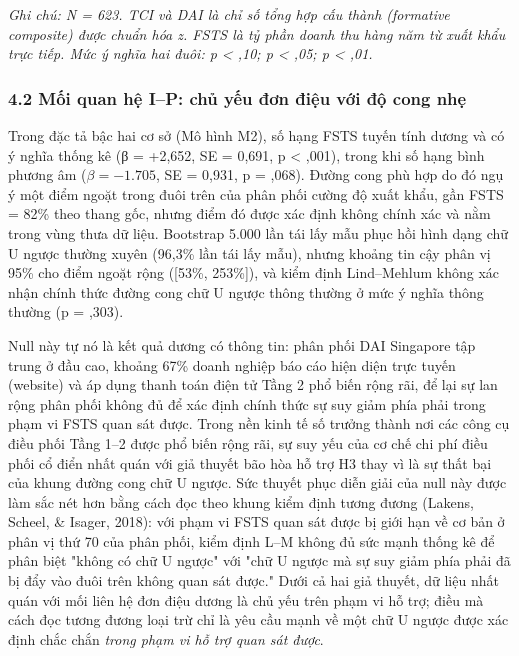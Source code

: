 \documentclass[12pt,a4paper]{article}
\begin{document}
\emph{Ghi chú: N = 623. TCI và DAI là chỉ số tổng hợp cấu thành
(formative composite) được chuẩn hóa z. FSTS là tỷ phần doanh thu hàng
năm từ xuất khẩu trực tiếp. Mức ý nghĩa hai đuôi: p \textless{} ,10; p
\textless{} ,05; p \textless{} ,01.}

\hypertarget{42-mux1ed1i-quan-hux1ec7-ip-chux1ee7-yux1ebfu-ux111ux1a1n-ux111iux1ec7u-vux1edbi-ux111ux1ed9-cong-nhux1eb9}{%
\subsubsection{4.2 Mối quan hệ I--P: chủ yếu đơn điệu với độ cong
nhẹ}\label{42-mux1ed1i-quan-hux1ec7-ip-chux1ee7-yux1ebfu-ux111ux1a1n-ux111iux1ec7u-vux1edbi-ux111ux1ed9-cong-nhux1eb9}}

Trong đặc tả bậc hai cơ sở (Mô hình M2), số hạng FSTS tuyến tính dương
và có ý nghĩa thống kê (β = +2,652, SE = 0,691, p \textless{} ,001),
trong khi số hạng bình phương âm (\(\beta = −1.705\), SE = 0,931, p =
,068). Đường cong phù hợp do đó ngụ ý một điểm ngoặt trong đuôi trên của
phân phối cường độ xuất khẩu, gần FSTS = 82\% theo thang gốc, nhưng điểm
đó được xác định không chính xác và nằm trong vùng thưa dữ liệu.
Bootstrap 5.000 lần tái lấy mẫu phục hồi hình dạng chữ U ngược thường
xuyên (96,3\% lần tái lấy mẫu), nhưng khoảng tin cậy phân vị 95\% cho
điểm ngoặt rộng ({[}53\%, 253\%{]}), và kiểm định Lind--Mehlum không xác
nhận chính thức đường cong chữ U ngược thông thường ở mức ý nghĩa thông
thường (p = ,303).

Null này tự nó là kết quả dương có thông tin: phân phối DAI Singapore
tập trung ở đầu cao, khoảng 67\% doanh nghiệp báo cáo hiện diện trực
tuyến (website) và áp dụng thanh toán điện tử Tầng 2 phổ biến rộng rãi,
để lại sự lan rộng phân phối không đủ để xác định chính thức sự suy giảm
phía phải trong phạm vi FSTS quan sát được. Trong nền kinh tế số trưởng
thành nơi các công cụ điều phối Tầng 1--2 được phổ biến rộng rãi, sự suy
yếu của cơ chế chi phí điều phối cổ điển nhất quán với giả thuyết bão
hòa hỗ trợ H3 thay vì là sự thất bại của khung đường cong chữ U ngược.
Sức thuyết phục diễn giải của null này được làm sắc nét hơn bằng cách
đọc theo khung kiểm định tương đương (Lakens, Scheel, \& Isager, 2018):
với phạm vi FSTS quan sát được bị giới hạn về cơ bản ở phân vị thứ 70
của phân phối, kiểm định L--M không đủ sức mạnh thống kê để phân biệt
"không có chữ U ngược" với "chữ U ngược mà sự suy giảm phía phải đã bị
đẩy vào đuôi trên không quan sát được." Dưới cả hai giả thuyết, dữ liệu
nhất quán với mối liên hệ đơn điệu dương là chủ yếu trên phạm vi hỗ trợ;
điều mà cách đọc tương đương loại trừ chỉ là yêu cầu mạnh về một chữ U
ngược được xác định chắc chắn \emph{trong phạm vi hỗ trợ quan sát được}.
\end{document}
